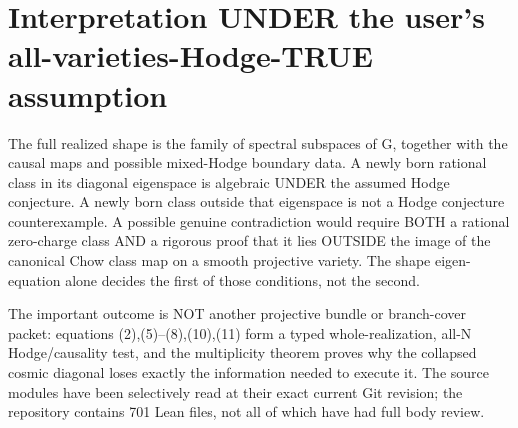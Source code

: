 \documentclass[11pt]{article}
\begin{document}
\section{Interpretation UNDER the user's all-varieties-Hodge-TRUE assumption}
The full realized shape is the family of
spectral subspaces of G, together with the
causal maps and possible mixed-Hodge boundary
data. A newly born rational class in its
diagonal eigenspace is algebraic UNDER
the assumed Hodge conjecture.
A newly born class outside that eigenspace
is not a Hodge conjecture counterexample.
A possible genuine contradiction would
require BOTH a rational zero-charge class
AND a rigorous proof that it lies OUTSIDE
the image of the canonical Chow class map
on a smooth projective variety. The
shape eigen-equation alone decides the
first of those conditions, not the second.

The important outcome is NOT another
projective bundle or branch-cover packet:
equations (2),(5)--(8),(10),(11) form a
typed whole-realization, all-N Hodge/causality
test, and the multiplicity theorem proves
why the collapsed cosmic diagonal loses
exactly the information needed to execute it.
The source modules have been selectively
read at their exact current Git revision;
the repository contains 701 Lean files,
not all of which have had full body review.
\end{document}
